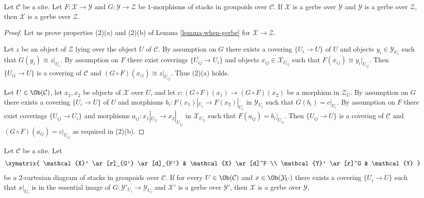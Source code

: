 \begin{lemma}
\label{lemma-composition-gerbe}
Let $\mathcal{C}$ be a site. Let
$F : \mathcal{X} \to \mathcal{Y}$ and $G : \mathcal{Y} \to \mathcal{Z}$
be $1$-morphisms of stacks in groupoids over $\mathcal{C}$.
If $\mathcal{X}$ is a gerbe over $\mathcal{Y}$ and
$\mathcal{Y}$ is a gerbe over $\mathcal{Z}$, then
$\mathcal{X}$ is a gerbe over $\mathcal{Z}$.
\end{lemma}

\begin{proof}
Let us prove properties (2)(a) and (2)(b) of
Lemma \ref{lemma-when-gerbe}
for $\mathcal{X} \to \mathcal{Z}$.

\medskip\noindent
Let $z$ be an object of $\mathcal{Z}$ lying over the object $U$
of $\mathcal{C}$. By assumption on $G$ there exists
a covering $\{U_i \to U\}$ of $U$ and objects
$y_i \in \mathcal{Y}_{U_i}$ such that $G(y_i) \cong z|_{U_i}$.
By assumption on $F$ there exist coverings $\{U_{ij} \to U_i\}$
and objects $x_{ij} \in \mathcal{X}_{U_{ij}}$ such that
$F(x_{ij}) \cong y_i|_{U_{ij}}$.
Then $\{U_{ij} \to U\}$ is a covering of $\mathcal{C}$
and $(G \circ F)(x_{ij}) \cong z|_{U_{ij}}$. Thus (2)(a) holds.

\medskip\noindent
Let $U \in \Ob(\mathcal{C})$, let $x_1, x_2$ be objects of
$\mathcal{X}$ over $U$, and let
$c : (G \circ F)(x_1) \to (G \circ F)(x_2)$ be a morphism in
$\mathcal{Z}_U$. By assumption on $G$ there exists
a covering $\{U_i \to U\}$ of $U$ and morphisms
$b_i : F(x_1)|_{U_i} \to F(x_2)|_{U_i}$ in $\mathcal{Y}_{U_i}$
such that $G(b_i) = c|_{U_i}$.
By assumption on $F$ there exist coverings $\{U_{ij} \to U_i\}$
and morphisms $a_{ij} : x_1|_{U_{ij}} \to x_2|_{U_{ij}}$ in
$\mathcal{X}_{U_{ij}}$ such that $F(a_{ij}) = b_i|_{U_{ij}}$.
Then $\{U_{ij} \to U\}$ is a covering of $\mathcal{C}$
and $(G \circ F)(a_{ij}) = c|_{U_{ij}}$ as required in (2)(b).
\end{proof}

\begin{lemma}
\label{lemma-gerbe-descent}
Let $\mathcal{C}$ be a site. Let
$$
\xymatrix{
\mathcal{X}' \ar[r]_{G'} \ar[d]_{F'} & \mathcal{X} \ar[d]^F \\
\mathcal{Y}' \ar[r]^G & \mathcal{Y}
}
$$
be a $2$-cartesian diagram of stacks in groupoids over $\mathcal{C}$.
If for every $U \in \Ob(\mathcal{C})$ and
$x \in \Ob(\mathcal{Y}_U)$ there exists a covering
$\{U_i \to U\}$ such that $x|_{U_i}$ is in the essential
image of $G : \mathcal{Y}'_{U_i} \to \mathcal{Y}_{U_i}$ and
$\mathcal{X}'$ is a gerbe over $\mathcal{Y}'$, then
$\mathcal{X}$ is a gerbe over $\mathcal{Y}$.
\end{lemma}

